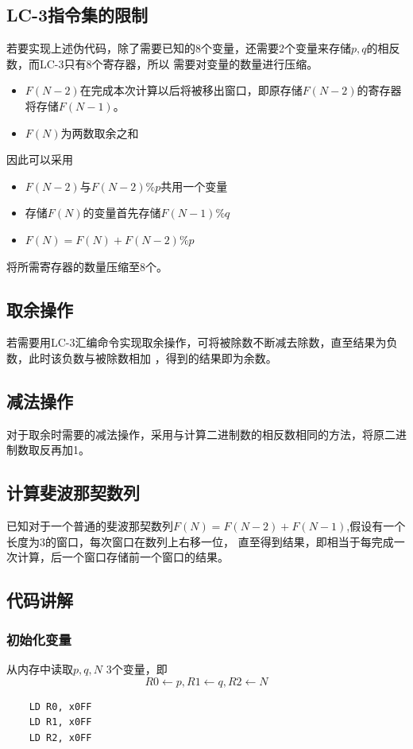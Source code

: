 \documentclass[12pt, a4paper, oneside]{ctexart}
\begin{document}
\subsection*{LC-3指令集的限制}
若要实现上述伪代码，除了需要已知的8个变量，还需要2个变量来存储$p,q$的相反数，而LC-3只有8个寄存器，所以
需要对变量的数量进行压缩。
\begin{itemize}
    \item $F(N-2)$在完成本次计算以后将被移出窗口，即原存储$F(N-2)$的寄存器将存储$F(N-1)$。
    \item $F(N)$为两数取余之和
\end{itemize}
因此可以采用
\begin{itemize}
    \item $F(N-2)$与$F(N-2) \% p$共用一个变量
    \item 存储$F(N)$的变量首先存储$F(N-1)\% q$
    \item $F(N) = F(N) + F(N-2) \% p$
\end{itemize}
将所需寄存器的数量压缩至8个。

\subsection*{取余操作}
若需要用LC-3汇编命令实现取余操作，可将被除数不断减去除数，直至结果为负数，此时该负数与被除数相加
，得到的结果即为余数。
\subsection*{减法操作}
对于取余时需要的减法操作，采用与计算二进制数的相反数相同的方法，将原二进制数取反再加1。

\subsection*{计算斐波那契数列}
已知对于一个普通的斐波那契数列$F(N) = F(N-2) + F(N-1)$,假设有一个长度为3的窗口，每次窗口在数列上右移一位，
直至得到结果，即相当于每完成一次计算，后一个窗口存储前一个窗口的结果。

\subsection*{代码讲解}
\subsubsection*{初始化变量}
从内存中读取$p,q,N$ 3个变量，即$$R0 \leftarrow p, R1 \leftarrow q, R2 \leftarrow N$$
\begin{lstlisting}
    LD R0, x0FF
    LD R1, x0FF
    LD R2, x0FF
\end{lstlisting}
\end{document}
